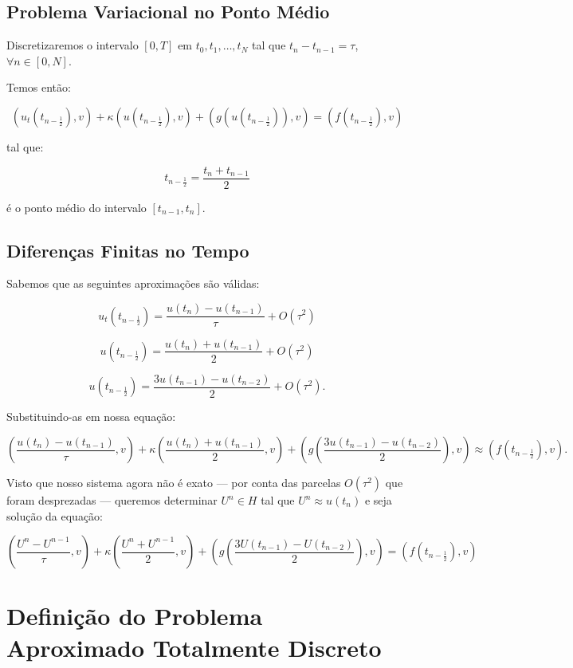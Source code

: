 \subsection{Problema Variacional no Ponto Médio}

  Discretizaremos o intervalo $[0, T]$ em $t_0, t_1, \dots, t_N$ tal que $t_n - t_{n-1} = \tau$, $\forall n \in [0, N]$.

  Temos então:

  \[(u_t(t_{n - \frac{1}{2}}), v) + \kappa(u(t_{n - \frac{1}{2}}), v) + (g(u(t_{n - \frac{1}{2}})), v)  = (f(t_{n - \frac{1}{2}}), v)\]

  tal que:

  \[t_{n - \frac{1}{2}} = \dfrac{t_n + t_{n-1}}{2}\]

  é o ponto médio do intervalo $[t_{n-1}, t_n]$.

\subsection{Diferenças Finitas no Tempo}

  Sabemos que as seguintes aproximações são válidas:

  \[u_t(t_{n - \frac{1}{2}}) = \dfrac{u(t_n) - u(t_{n-1})}{\tau} + O(\tau^2)\]

  \[u(t_{n - \frac{1}{2}}) = \dfrac{u(t_n) + u(t_{n-1})}{2} + O(\tau^2)\]

  \[u(t_{n - \frac{1}{2}}) = \dfrac{3u(t_{n-1}) - u(t_{n-2})}{2} + O(\tau^2).\]

  Substituindo-as em nossa equação:

  \[\left(\dfrac{u(t_n) - u(t_{n-1})}{\tau}, v\right) + \kappa\left(\dfrac{u(t_n) + u(t_{n-1})}{2}, v\right) + \left(g\left(\dfrac{3u(t_{n-1}) - u(t_{n-2})}{2}\right), v\right) \approx (f(t_{n - \frac{1}{2}}), v).\]

  Visto que nosso sistema agora não é exato --- por conta das parcelas $O(\tau^2)$ que foram desprezadas --- queremos determinar $U^n \in H$ tal que $U^n \approx u(t_n)$ e seja solução da equação:

  \[\left(\dfrac{U^n - U^{n-1}}{\tau}, v\right) + \kappa\left(\dfrac{U^n + U^{n-1}}{2}, v\right) + \left(g\left(\dfrac{3U(t_{n-1}) - U(t_{n-2})}{2}\right), v\right) = (f(t_{n - \frac{1}{2}}), v)\]

\section{Definição do Problema Aproximado Totalmente Discreto}

